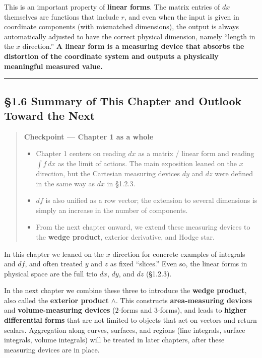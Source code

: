 This is an important property of \textbf{linear forms}. The matrix
entries of \(dx\) themselves are functions that include \(r\), and even
when the input is given in coordinate components (with mismatched
dimensions), the output is always automatically adjusted to have the
correct physical dimension, namely ``length in the \(x\) direction.''
\textbf{A linear form is a measuring device that absorbs the distortion
of the coordinate system and outputs a physically meaningful measured
value.}

\begin{center}\rule{0.5\linewidth}{0.5pt}\end{center}

\hypertarget{summary-of-this-chapter-and-outlook-toward-the-next}{%
\subsection{§1.6 Summary of This Chapter and Outlook Toward the
Next}\label{summary-of-this-chapter-and-outlook-toward-the-next}}

\begin{quote}
\textbf{Checkpoint — Chapter 1 as a whole}

\begin{itemize}
\item
  Chapter 1 centers on reading \(dx\) as a matrix / linear form and
  reading \(\int f\,dx\) as the limit of actions. The main exposition
  leaned on the \(x\) direction, but the Cartesian measuring devices
  \(dy\) and \(dz\) were defined in the same way as \(dx\) in §1.2.3.
\item
  \(df\) is also unified as a row vector; the extension to several
  dimensions is simply an increase in the number of components.
\item
  From the next chapter onward, we extend these measuring devices to the
  \textbf{wedge product}, exterior derivative, and Hodge star.
\end{itemize}
\end{quote}

In this chapter we leaned on the \(x\) direction for concrete examples
of integrals and \(df\), and often treated \(y\) and \(z\) as fixed
``slices.'' Even so, the linear forms in physical space are the full
trio \(dx\), \(dy\), and \(dz\) (§1.2.3).

In the next chapter we combine these three to introduce the
\textbf{wedge product}, also called the \textbf{exterior product}
\(\wedge\). This constructs \textbf{area-measuring devices} and
\textbf{volume-measuring devices} (\(2\)-forms and \(3\)-forms), and
leads to \textbf{higher differential forms} that are not limited to
objects that act on vectors and return scalars. Aggregation along
curves, surfaces, and regions (line integrals, surface integrals, volume
integrals) will be treated in later chapters, after these measuring
devices are in place.

